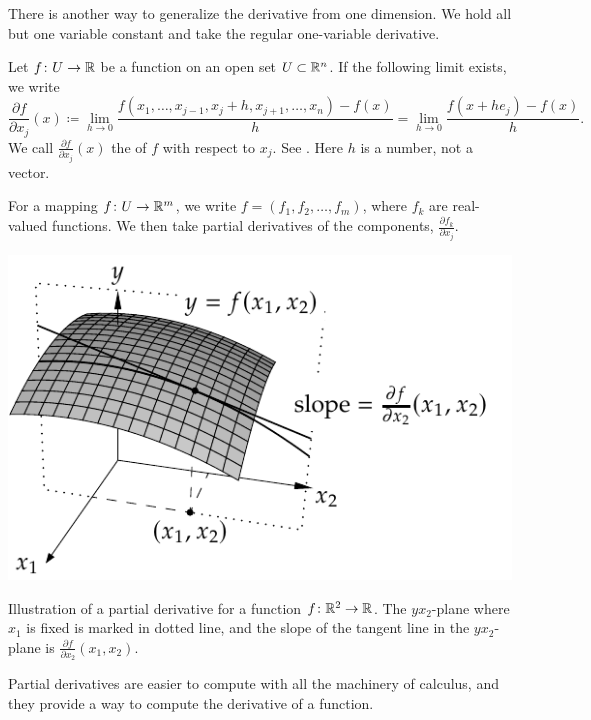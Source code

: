 There is another way to generalize the derivative from one dimension.
We hold all but one variable constant and take the regular
one-variable derivative.

\begin{defn}
Let
$f \colon U \to {\mathbb{R}}$ be a function on an open set $U \subset {\mathbb{R}}^n$.
If the following limit exists, we write
\begin{equation*}
\frac{\partial f}{\partial x_j} (x) \coloneqq 
\lim_{h\to 0}\frac{f(x_1,\ldots,x_{j-1},x_j+h,x_{j+1},\ldots,x_n)-f(x)}{h}
=
\lim_{h\to 0}\frac{f(x+h e_j)-f(x)}{h} .
\end{equation*}
We call 
$\frac{\partial f}{\partial x_j} (x)$ the \emph{}
of $f$
with respect to $x_j$.  %
See .
Here $h$ is a number, not a vector.

For a mapping $f \colon U \to {\mathbb{R}}^m$, we write
$f = (f_1,f_2,\ldots,f_m)$, where $f_k$ are real-valued
functions.  We then take partial derivatives of
the components,
$\frac{\partial f_k}{\partial x_j}$.
\end{defn}

\begin{myfigureht}
\includegraphics{figures/svpartder}
\caption{Illustration of a partial derivative for a function $f \colon {\mathbb{R}}^2
\to {\mathbb{R}}$.  The $yx_2$-plane where $x_1$ is fixed is marked in dotted line,
and the slope of the tangent line in the $yx_2$-plane is
$\frac{\partial f}{\partial x_2}(x_1,x_2)$.\label{fig:svpartder}}
\end{myfigureht}

Partial derivatives are easier to compute with all the machinery of
calculus, and they provide a way to compute the derivative of a
function.

